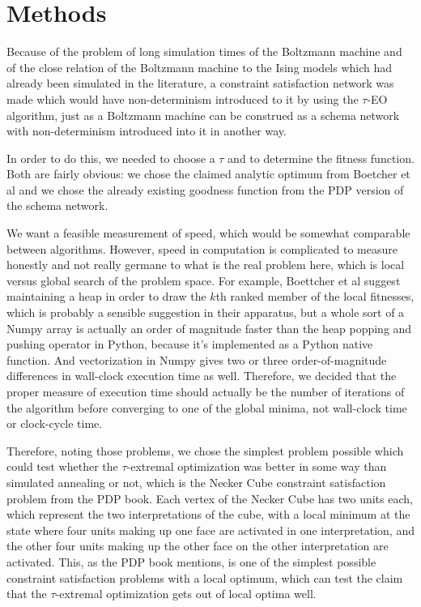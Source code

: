 \documentclass[12pt]{article}
\begin{document}
\section{Methods}

Because of the problem of long simulation times of the Boltzmann machine and of the close relation of the Boltzmann machine to the Ising models which had already been simulated in the literature, a constraint satisfaction network was made which would have non-determinism introduced to it by using the $\tau$-EO algorithm, just as a Boltzmann machine can be construed as a schema network with non-determinism introduced into it in another way.\cite{pdp}

In order to do this, we needed to choose a $\tau$ and to determine the fitness function. Both are fairly obvious: we chose the claimed analytic optimum from Boetcher et al \cite{boettcher2} and we chose the already existing goodness function from the PDP version of the schema network.

We want a feasible measurement of speed, which would be somewhat comparable between algorithms. However, speed in computation is complicated to measure honestly and not really germane to what is the real problem here, which is local versus global search of the problem space. For example, Boettcher et al\cite{boettcher2} suggest maintaining a heap in order to draw the $k$th ranked member of the local fitnesses, which is probably a sensible suggestion in their apparatus, but a whole sort of a Numpy array is actually an order of magnitude faster than the heap popping and pushing operator in Python, because it's implemented as a Python native function. And vectorization in Numpy gives two or three order-of-magnitude differences in wall-clock execution time as well. Therefore, we decided that the proper measure of execution time should actually be the number of iterations of the algorithm before converging to one of the global minima, not wall-clock time or clock-cycle time.

Therefore, noting those problems, we chose the simplest problem possible which could test whether the $\tau$-extremal optimization was better in some way than simulated annealing or not, which is the Necker Cube constraint satisfaction problem from the PDP book. Each vertex of the Necker Cube has two units each, which represent the two interpretations of the cube, with a local minimum at the state where four units making up one face are activated in one interpretation, and the other four units making up the other face on the other interpretation are activated. This, as the PDP book mentions\cite{pdp}, is one of the simplest possible constraint satisfaction problems with a local optimum, which can test the claim that the $\tau$-extremal optimization gets out of local optima well.
\end{document}
